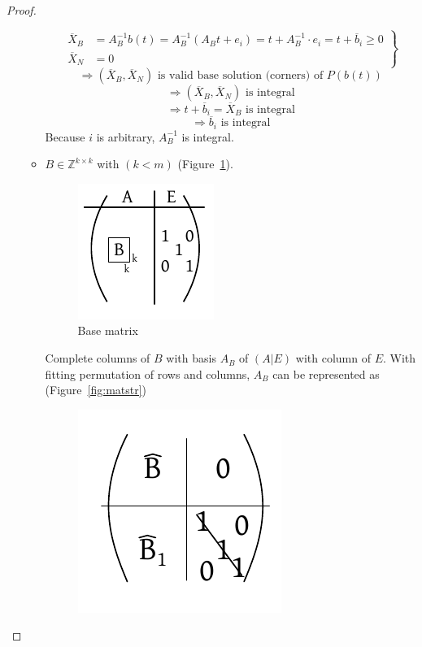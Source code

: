\documentclass[a4paper]{article}
\theoremstyle{definition}
\begin{document}
\begin{proof}
\begin{itemize}
\begin{itemize}
          \[
            \left.\begin{array}{ll}
              \overline{X}_B &= A_B^{-1} b(t) = A_B^{-1} (A_B t + e_i) = t + A_B^{-1} \cdot e_i = t + \overline{b}_i \geq 0 \\
              \overline{X}_N &= 0
            \end{array}\right\}
          \] %
          \[ \Rightarrow (\overline{X}_B, \overline{X}_N) \text{ is valid base solution (corners) of } P(b(t)) \]
          \[ \Rightarrow (\overline{X}_B, \overline{X}_N) \text{ is integral} \]
          \[ \Rightarrow t + \overline{b}_i = \overline{X}_B \text{ is integral} \]
          \[ \Rightarrow \overline{b}_i \text{ is integral} \]
          Because $i$ is arbitrary, $A_B^{-1}$ is integral.
        \item
          $B \in \mathbb{Z}^{k \times k}$ with $(k < m)$ (Figure~\ref{fig:basematr}).
          \begin{figure}[!ht]
            \begin{center}
              \includegraphics{img/basematrix.pdf}
              \caption{Base matrix}
              \label{fig:basematr}
            \end{center}
          \end{figure}
          Complete columns of $B$ with basis $A_B$ of $(A | E)$ with column of $E$.
          With fitting permutation of rows and columns, $A_B$ can be represented as (Figure~\ref{fig:matstr})
          \begin{figure}[!ht]
            \begin{center}
              \includegraphics{img/matrix_structure.pdf}

\end{center}
\end{figure}
\end{itemize}
\end{itemize}
\end{proof}
\end{document}
